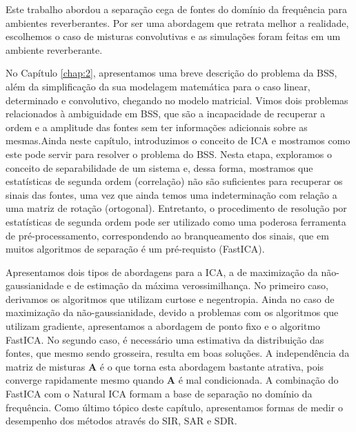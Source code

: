 
Este trabalho abordou a separação cega de fontes do domínio da frequência para ambientes reverberantes. Por ser uma abordagem que retrata melhor a realidade, escolhemos o caso de misturas convolutivas e as simulações foram feitas em um ambiente reverberante.

No Capítulo \ref{chap:2}, apresentamos uma breve descrição do problema da BSS, além da simplificação da sua modelagem matemática para o caso linear, determinado e convolutivo, chegando no modelo matricial. Vimos dois problemas relacionados à ambiguidade em BSS, que são a incapacidade de recuperar a ordem e a amplitude das fontes sem ter informações adicionais sobre as mesmas.Ainda neste capítulo, introduzimos o conceito de ICA e mostramos como este pode servir para resolver o problema do BSS. Nesta etapa, exploramos o conceito de separabilidade de um sistema e, dessa forma, mostramos que estatísticas de segunda ordem (correlação) não são suficientes para recuperar os sinais das fontes, uma vez que ainda temos uma indeterminação com relação a uma matriz de rotação (ortogonal). Entretanto, o procedimento de resolução por estatísticas de segunda ordem pode ser utilizado como uma poderosa ferramenta de pré-processamento, correspondendo ao branqueamento dos sinais, que em muitos algoritmos de separação é um pré-requisto (FastICA). 

Apresentamos dois tipos de abordagens para a ICA, a de maximização da não-gaussianidade e de estimação da máxima verossimilhança. No primeiro caso, derivamos os algoritmos que utilizam curtose e negentropia. Ainda no caso de maximização da não-gaussianidade, devido a problemas com os algoritmos que utilizam gradiente, apresentamos a abordagem de ponto fixo e o algoritmo FastICA. No segundo caso, é necessário uma estimativa da distribuição das fontes, que mesmo sendo grosseira, resulta em boas soluções. A independência da matriz de misturas $\mathbf{A}$ é o que torna esta abordagem bastante atrativa, pois converge rapidamente mesmo quando $\mathbf{A}$ é mal condicionada. A combinação do FastICA com o Natural ICA formam a base de separação no domínio da frequência. Como último tópico deste capítulo, apresentamos formas de medir o desempenho dos métodos através do SIR, SAR e SDR.

